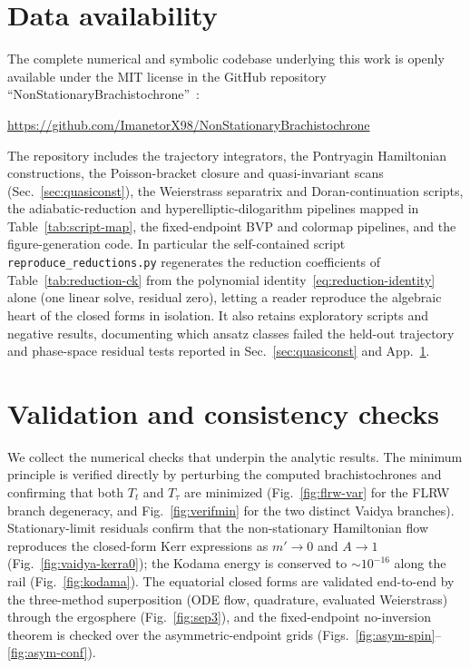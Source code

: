 \documentclass[12pt]{iopart}
\begin{document}
\section*{Data availability}
The complete numerical and symbolic codebase underlying this work is openly
available under the MIT license in the GitHub repository
``NonStationary\-Brachi\-sto\-chrone''~\cite{Rosignoli2026Code}:
\begin{center}
\url{https://github.com/ImanetorX98/NonStationaryBrachistochrone}
\end{center}
The repository includes the trajectory integrators, the Pontryagin Hamiltonian
constructions, the Poisson-bracket closure and quasi-invariant scans
(Sec.~\ref{sec:quasiconst}), the Weierstrass separatrix and Doran-continuation
scripts, the adiabatic-reduction and hyperelliptic-dilogarithm pipelines mapped in
Table~\ref{tab:script-map}, the fixed-endpoint BVP and colormap pipelines, and the
figure-generation code. In particular the self-contained script
\texttt{reproduce\_reductions.py} regenerates the reduction coefficients of
Table~\ref{tab:reduction-ck} from the polynomial
identity~\eqref{eq:reduction-identity} alone (one linear solve, residual zero),
letting a reader reproduce the algebraic heart of the closed forms in isolation. It
also retains exploratory scripts and negative results,
documenting which ansatz classes failed the held-out trajectory and phase-space
residual tests reported in Sec.~\ref{sec:quasiconst} and
App.~\ref{app:validation}.



\appendix
\section{Validation and consistency checks}
\label{app:validation}
We collect the numerical checks that underpin the analytic results. The
minimum principle is verified directly by perturbing the computed
brachistochrones and confirming that both $T_t$ and $T_\tau$ are minimized
(Fig.~\ref{fig:flrw-var} for the FLRW branch degeneracy, and
Fig.~\ref{fig:verifmin} for the two distinct Vaidya branches). Stationary-limit
residuals confirm that the non-stationary
Hamiltonian flow reproduces the closed-form Kerr expressions as $m'\to0$ and
$A\to1$ (Fig.~\ref{fig:vaidya-kerra0}); the Kodama energy is conserved to
$\sim10^{-16}$ along the rail (Fig.~\ref{fig:kodama}). The equatorial closed
forms are validated end-to-end by the three-method superposition
(ODE flow, quadrature, evaluated Weierstrass) through the ergosphere
(Fig.~\ref{fig:sep3}), and the fixed-endpoint no-inversion theorem is
checked over the asymmetric-endpoint grids (Figs.~\ref{fig:asym-spin}--%
\ref{fig:asym-conf}).
\end{document}
